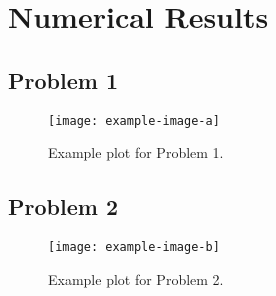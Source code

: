 \chapter{Numerical Results}

\section{Problem 1}
\begin{figure}[H]
    \centering
    \texttt{[image: example-image-a]}
    \caption{Example plot for Problem 1.}
    \label{fig:problem1}
\end{figure}

\section{Problem 2}
\begin{figure}[H]
    \centering
    \texttt{[image: example-image-b]}
    \caption{Example plot for Problem 2\cite{nocedalwright2006numerical}.}
    \label{fig:problem2}
\end{figure}